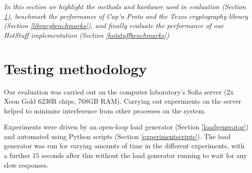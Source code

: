 



\textit{In this section we highlight the methods and hardware used in evaluation (Section \ref{testingmethods}), benchmark the performance of Cap'n Proto and the Tezos cryptography library (Section \ref{librarybenchmarks}), and finally evaluate the performance of our HotStuff implementation (Section \ref{hotstuffbenchmarks})}

\section{Testing methodology} \label{testingmethods}
Our evaluation was carried out on the computer laboratory's Sofia server (2x Xeon Gold 6230R chips, 768GB RAM). Carrying out experiments on the server helped to minimise interference from other processes on the system.

Experiments were driven by an open-loop load generator (Section \ref{loadgenerator}) and automated using Python scripts (Section \ref{experimentscripts}). The load generator was run for varying amounts of time in the different experiments, with a further 15 seconds after this without the load generator running to wait for any slow responses.

